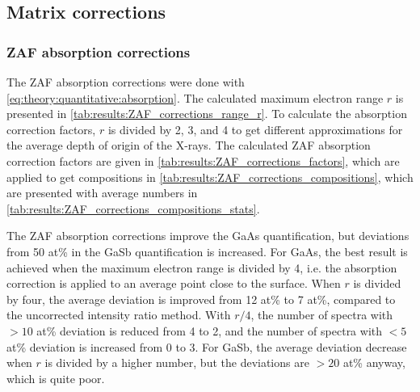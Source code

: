 










\clearpage


\subsection{Matrix corrections}
\label{results:matrix_corrections}



\subsubsection{ZAF absorption corrections}
\label{results:matrix_corrections:ZAF}

The ZAF absorption corrections were done with \cref{eq:theory:quantitative:absorption}. %
The calculated maximum electron range $r$ is presented in \cref{tab:results:ZAF_corrections_range_r}.
To calculate the absorption correction factors, $r$ is divided by 2, 3, and 4 to get different approximations for the average depth of origin of the X-rays.
The calculated ZAF absorption correction factors are given in \cref{tab:results:ZAF_corrections_factors}, which are applied to get compositions in \cref{tab:results:ZAF_corrections_compositions}, which are presented with average numbers in \cref{tab:results:ZAF_corrections_compositions_stats}.


The ZAF absorption corrections improve the GaAs quantification, but deviations from 50 at\% in the GaSb quantification is increased.
For GaAs, the best result is achieved when the maximum electron range is divided by 4, i.e. the absorption correction is applied to an average point close to the surface.
When $r$ is divided by four, the average deviation is improved from 12 at\% to 7 at\%, compared to the uncorrected intensity ratio method.
With $r/4$, the number of spectra with $> 10$ at\% deviation is reduced from 4 to 2, and the number of spectra with $< 5$ at\% deviation is increased from 0 to 3.
For GaSb, the average deviation decrease when $r$ is divided by a higher number, but the deviations are $> 20$ at\% anyway, which is quite poor.


